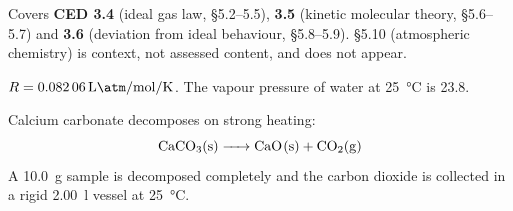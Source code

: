 \documentclass{apchem-exam}
\begin{document}
\apctitleblock

\begin{apcnote}[Scope]
Covers \textbf{CED 3.4} (ideal gas law, \S5.2--5.5), \textbf{3.5}
(kinetic molecular theory, \S5.6--5.7) and \textbf{3.6} (deviation from
ideal behaviour, \S5.8--5.9). \S5.10 (atmospheric chemistry) is context,
not assessed content, and does not appear.

$R = \SI{0.08206}{\litre\atm\per\mole\per\kelvin}$. The vapour pressure of
water at \SI{25}{\celsius} is \SI{23.8}{\torr}.
\end{apcnote}



Calcium carbonate decomposes on strong heating:
\[ \ce{CaCO3(s) -> CaO(s) + CO2(g)} \]
A \SI{10.0}{\gram} sample is decomposed completely and the carbon dioxide
is collected in a rigid \SI{2.00}{\litre} vessel at \SI{25}{\celsius}.
\end{document}
